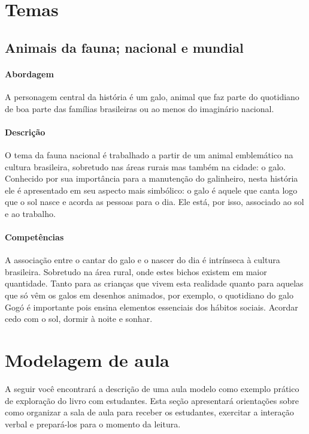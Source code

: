 \documentclass[11pt]{extarticle}
\begin{document}


\section{Temas}

\subsection{Animais da fauna; nacional e mundial}

\paragraph{Abordagem} 
A personagem central da história é um galo, animal que faz parte do quotidiano de
boa parte das famílias brasileiras ou ao menos do imaginário nacional. 
\paragraph{Descrição} 
O tema da fauna nacional é trabalhado a partir de um animal emblemático
na cultura brasileira, sobretudo nas áreas rurais mas também na cidade: o galo.
Conhecido por sua importância para a manutenção do galinheiro, nesta história
ele é apresentado em seu aspecto mais simbólico: o galo é aquele que canta logo
que o sol nasce e acorda as pessoas para o dia. Ele está, por isso, associado
ao sol e ao trabalho. 
\paragraph{Competências} 
A associação entre o cantar do galo e o nascer do dia é intrínseca
à cultura brasileira. Sobretudo na área rural, onde estes bichos
existem em maior quantidade. Tanto para as crianças que vivem
esta realidade quanto para aquelas que só vêm os galos em desenhos
animados, por exemplo, o quotidiano do galo Gogó é importante 
pois ensina elementos essenciais dos hábitos sociais. Acordar cedo com
o sol, dormir à noite e sonhar. 

\section{Modelagem de aula}
A seguir você encontrará a descrição de uma aula modelo como exemplo 
prático de exploração do livro com estudantes. Esta seção apresentará 
orientações sobre como organizar a sala de aula para receber os 
estudantes, exercitar a interação verbal e prepará-los para o 
momento da leitura.
\end{document}
